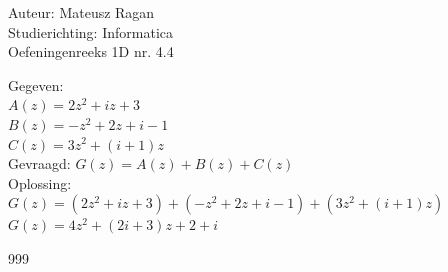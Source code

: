 \documentclass[a4paper]{article}
\begin{document}
\noindent \large Auteur: Mateusz Ragan \\
\noindent \large Studierichting: Informatica\\
\noindent \large Oefeningenreeks 1D nr. 4.4\\

\medskip

\normalsize

Gegeven:\\

$A(z) = 2z^2 + iz +3$\\

$B(z) = -z^2 + 2z + i-1$\\

$C(z) = 3z^2 + (i+1)z$\\

Gevraagd: $G(z) = A(z) + B(z) + C(z)$\\

Oplossing: $G(z) = (2z^2 + iz +3) + (-z^2 + 2z + i-1) + (3z^2 + (i+1)z)$ \\ 

$G(z) = 4z^2 +(2i+3)z + 2 + i$

\begin{thebibliography}{999}
\end{thebibliography}
\end{document}
